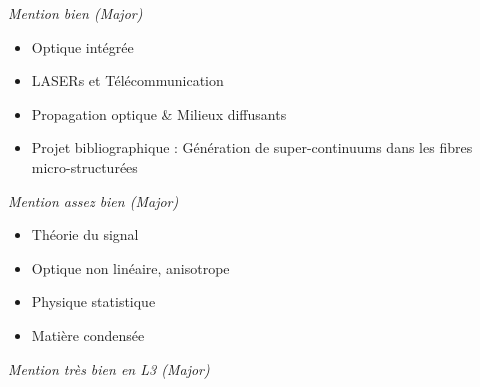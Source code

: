 \documentclass[9pt,a4paper,academicons]{altacv}
\begin{document}

\hfill \textit{Mention bien (Major)}
\vspace{-1em}\small{
	
  \begin{itemize}
    \item Optique intégrée
    \item LASERs et Télécommunication
    \item Propagation optique \& Milieux diffusants
    \item Projet bibliographique : Génération de super-continuums dans les fibres micro-structurées
  \end{itemize}
}

\divider

\hfill\textit{Mention assez bien (Major)}
\vspace{-1em}\small{
  \begin{itemize}
    \item Théorie du signal
    \item Optique non linéaire, anisotrope
    \item Physique statistique
    \item Matière condensée
  \end{itemize}
}
\divider

\hfill \textit{Mention très bien en L3 (Major)}






\end{document}
